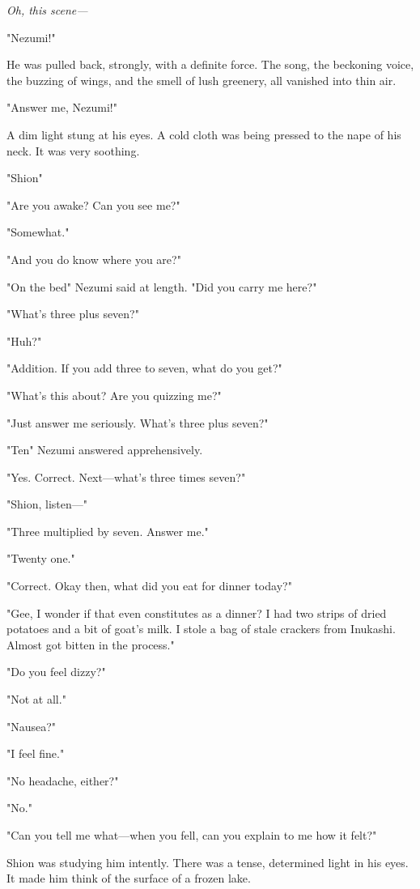 \emph{Oh, this scene---}

"Nezumi!"

He was pulled back, strongly, with a definite force. The song, the
beckoning voice, the buzzing of wings, and the smell of lush greenery,
all vanished into thin air.

"Answer me, Nezumi!"

A dim light stung at his eyes. A cold cloth was being pressed to the
nape of his neck. It was very soothing.

"Shion\el "

"Are you awake? Can you see me?"

"Somewhat."

"And you do know where you are?"

"On the bed\el " Nezumi said at length. "Did you carry me here?"

"What's three plus seven?"

"Huh?"

"Addition. If you add three to seven, what do you get?"

"What's this about? Are you quizzing me?"

"Just answer me seriously. What's three plus seven?"

"Ten\el " Nezumi answered apprehensively.

"Yes. Correct. Next---what's three times seven?"

"Shion, listen---"

"Three multiplied by seven. Answer me."

"Twenty one."

"Correct. Okay then, what did you eat for dinner today?"

"Gee, I wonder if that even constitutes as a dinner? I had two strips of
dried potatoes and a bit of goat's milk. I stole a bag of stale crackers
from Inukashi. Almost got bitten in the process."

"Do you feel dizzy?"

"Not at all."

"Nausea?"

"I feel fine."

"No headache, either?"

"No."

"Can you tell me what---when you fell, can you explain to me how it felt?"

Shion was studying him intently. There was a tense, determined light in
his eyes. It made him think of the surface of a frozen lake.

